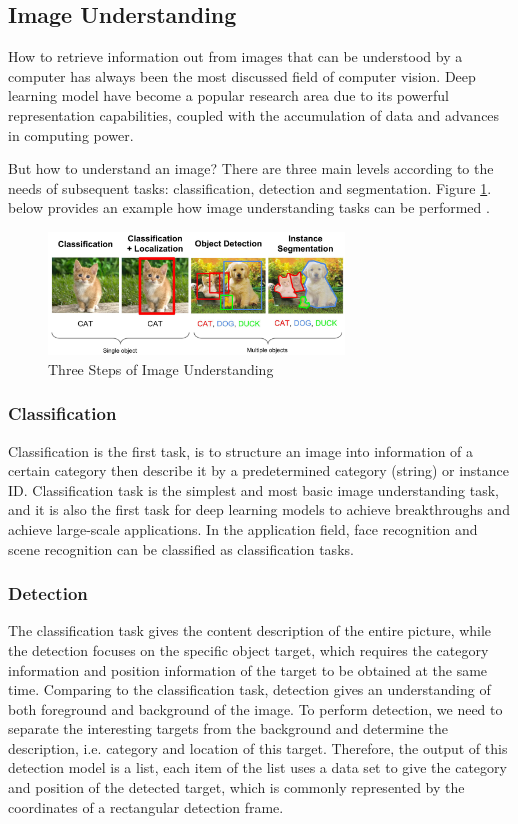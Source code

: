 \subsection{Image Understanding}
How to retrieve information out from images that can be understood by a computer has always been the most discussed field of computer vision. Deep learning model have become a popular research area due to its powerful representation capabilities, coupled with the accumulation of data and advances in computing power.

But how to understand an image? There are three main levels according to the needs of subsequent tasks: classification, detection and segmentation. Figure \ref{fig:odsteps}. below provides an example how image understanding tasks can be performed \cite{ouaknine_2018}.

\begin{figure}[h!]
\centering
\includegraphics[width=0.7\textwidth]{dlstep.pdf}
\caption{Three Steps of Image Understanding \cite{ouaknine_2018}}
\label{fig:odsteps}
\end{figure}

\subsubsection{Classification}
Classification is the first task, is to structure an image into information of a certain category then describe it by a predetermined category (string) or instance ID. Classification task is the simplest and most basic image understanding task, and it is also the first task for deep learning models to achieve breakthroughs and achieve large-scale applications. In the application field, face recognition and scene recognition can be classified as classification tasks.

\subsubsection{Detection}
The classification task gives the content description of the entire picture, while the detection focuses on the specific object target, which requires the category information and position information of the target to be obtained at the same time. Comparing to the classification task, detection gives an understanding of both foreground and background of the image. To perform detection, we need to separate the interesting targets from the background and determine the description, i.e. category and location of this target. Therefore, the output of this detection model is a list, each item of the list uses a data set to give the category and position of the detected target, which is commonly represented by the coordinates of a rectangular detection frame.

